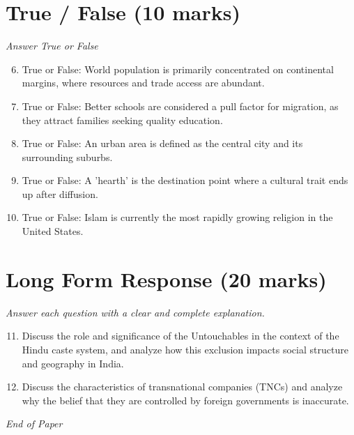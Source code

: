 \documentclass[12pt]{article}
\begin{document}
\section*{True / False (10 marks)}
\textit{Answer True or False}
\begin{enumerate}[label=\arabic*.]
\setcounter{enumi}{5}
\item True or False: World population is primarily concentrated on continental margins, where resources and trade access are abundant.
\item True or False: Better schools are considered a pull factor for migration, as they attract families seeking quality education.
\item True or False: An urban area is defined as the central city and its surrounding suburbs.
\item True or False: A 'hearth' is the destination point where a cultural trait ends up after diffusion.
\item True or False: Islam is currently the most rapidly growing religion in the United States.
\end{enumerate}

\section*{Long Form Response (20 marks)}
\textit{Answer each question with a clear and complete explanation.}
\begin{enumerate}[label=\arabic*.]
\setcounter{enumi}{10}
\item Discuss the role and significance of the Untouchables in the context of the Hindu caste system, and analyze how this exclusion impacts social structure and geography in India.
\item Discuss the characteristics of transnational companies (TNCs) and analyze why the belief that they are controlled by foreign governments is inaccurate.
\end{enumerate}

\vfill
\noindent\textit{End of Paper}
\end{document}
